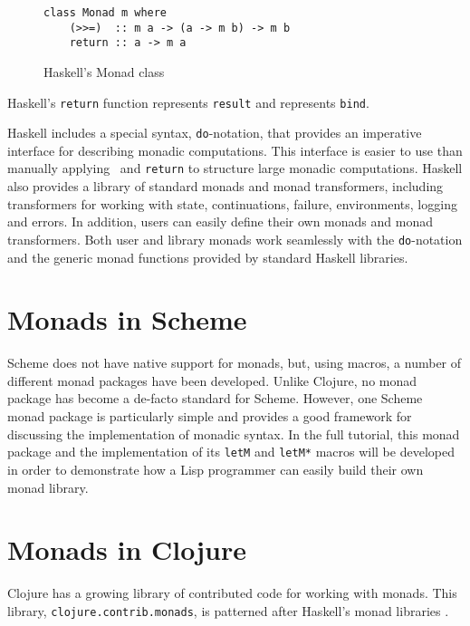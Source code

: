 \documentclass[natbib,10pt]{sigplanconf}
\begin{document}
\begin{figure}
\begin{center}
\begin{verbatim}
class Monad m where
    (>>=)  :: m a -> (a -> m b) -> m b
    return :: a -> m a
\end{verbatim}
\end{center}
\caption{Haskell's Monad class}
\label{fig-Haskell-Monad-class}
\end{figure}

Haskell's {\tt return} function represents \texttt{result} and
\hbind \linebreak represents \texttt{bind}.

Haskell includes a special syntax, {\tt do}-notation, that provides
an imperative interface for describing monadic computations. This
interface is easier to use than manually applying \hbind \ and {\tt return}
to structure large monadic computations. Haskell also provides a
library of standard monads and monad transformers, including
transformers for working with state, continuations, failure,
environments, logging and errors.  In addition, users can easily
define their own monads and monad transformers. Both user and
library monads work seamlessly with the {\tt do}-notation and
the generic monad functions provided by standard Haskell
libraries.

\section{Monads in Scheme}

Scheme does not have native support for monads, but, using macros,
a number of different monad packages have been developed. Unlike
Clojure, no monad package has become a de-facto
standard for Scheme. However, one Scheme monad package \citep{scheme-monads}
is particularly simple and provides a good framework for discussing
the implementation of monadic syntax. In the full tutorial, this monad
package and the implementation of its {\tt letM} and {\tt letM*} macros
will be developed in order to demonstrate how a Lisp programmer can easily
build their own monad library.

\section{Monads in Clojure}

Clojure has a growing library of contributed code for working with
monads. This library, {\tt clojure.contrib.monads}, is patterned after
Haskell's monad libraries \citep{clojure-monads1, clojure-monads2}.
\end{document}

